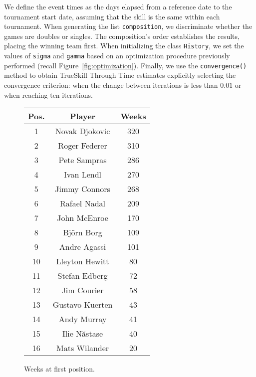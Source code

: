 \documentclass[article]{jss}
\begin{document}
We define the event times as the days elapsed from a reference date to the tournament start date, assuming that the skill is the same within each tournament. 
When generating the list \texttt{composition}, we discriminate whether the games are doubles or singles. 
The composition’s order establishes the results, placing the winning team first. 
When initializing the class \texttt{History}, we set the values of \texttt{sigma} and \texttt{gamma} based on an optimization procedure previously performed (recall Figure~\ref{fig:optimization}). 
Finally, we use the \texttt{convergence()} method to obtain TrueSkill Through Time estimates explicitly selecting the convergence criterion: when the change between iterations is less than $0.01$ or when reaching ten iterations. 
%
\begin{figure}[ht!]
\begin{subtable}[b]{0.29\textwidth}
    \scriptsize
    \begin{tabular}{c | c | c}
    Pos. &  Player                  &   Weeks\\
    \hline
    1       &   Novak Djokovic      &   320\\
    2       &   Roger Federer       &	310\\
    3       &	Pete Sampras        &   286\\
    4       &   Ivan Lendl          &   270\\
    5       &   Jimmy Connors       &   268\\
    6       &   Rafael Nadal        &   209\\
    7       &   John McEnroe        &   170\\
    8       &   Bj\"orn Borg        &   109\\
    9       &   Andre Agassi        &   101\\
    10      &   Lleyton Hewitt      &   80 \\
    11 	    &   Stefan Edberg       & 	72\\
    12 	    &   Jim Courier         & 	58\\
    13 	    &   Gustavo Kuerten     & 	43\\
    14 	    &   Andy Murray         & 	41\\
    15 	    &   Ilie N\u{a}stase    & 	40\\
    16 	    &   Mats Wilander       & 	20 \\
    \end{tabular}
    \caption{Weeks at first position.}
    \label{tab:atp_weeks}
\end{subtable}

\end{figure}
\end{document}
